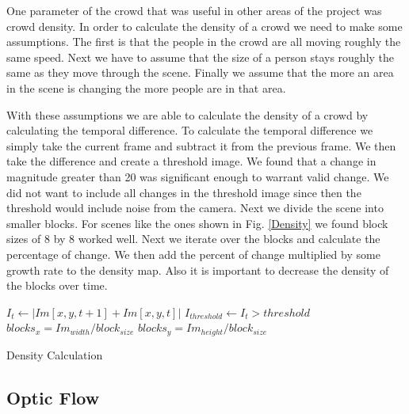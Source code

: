 \documentclass[12pt, onecolumn, conference]{IEEEtran}
\begin{document}
One parameter of the crowd that was useful in other areas of the project was crowd density. In order to calculate the density of a crowd we need to make some assumptions. The first is that the people in the crowd are all moving roughly the same speed. Next we have to assume that the size of a person stays roughly the same as they move through the scene. Finally we assume that the more an area in the scene is changing the more people are in that area.

With these assumptions we are able to calculate the density of a crowd by calculating the temporal difference. To calculate the temporal difference we simply take the current frame and subtract it from the previous frame. We then take the difference and create a threshold image. We found that a change in magnitude greater than 20 was significant enough to warrant valid change. We did not want to include all changes in the threshold image since then the threshold would include noise from the camera. Next we divide the scene into smaller blocks. For scenes like the ones shown in Fig. \ref{Density} we found block sizes of 8 by 8 worked well. Next we iterate over the blocks and calculate the percentage of change. We then add the percent of change multiplied by some growth rate to the density map. Also it is important to decrease the density of the blocks over time.

\begin{algorithm}
\DontPrintSemicolon
 $I_{t} \leftarrow | Im[x, y, t+1] + Im[x, y, t] | $\;
 $I_{threshold} \leftarrow I_{t} > threshold$\;
 $blocks_{x} = Im_{width}/block_{size}$\;
 $blocks_{y} = Im_{height}/block_{size}$\;
\caption{Density Calculation}
\end{algorithm}

\subsection{Optic Flow}
\end{document}
